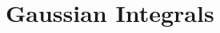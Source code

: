 \documentclass[11pt,twoside]{report}
\begin{document}
\chapter{Gaussian Integrals}
\label{chap:lec0}

\end{document}
